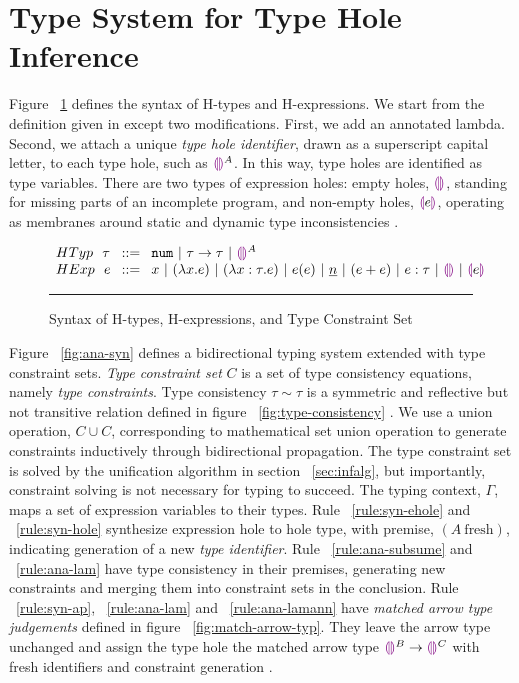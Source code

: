 \section{Type System for Type Hole Inference}
\label{sec:typinf}
Figure ~\ref{fig:syntax_fig} defines the syntax of H-types and H-expressions. We start from the definition given in \citet{HazelnutPOPL} except two modifications. First, we add an annotated lambda. Second, we attach a unique \emph{type hole identifier}, drawn as a superscript capital letter, to each type hole, such as $\textcolor{violet}{\llparenthesis}\textcolor{violet}{\rrparenthesis}^A$. In this way, type holes are identified as type variables. There are two types of expression holes: empty holes, $\textcolor{violet}{\llparenthesis}\textcolor{violet}{\rrparenthesis}$, standing for missing parts of an incomplete program, and non-empty holes, $\textcolor{violet}{\llparenthesis} e \textcolor{violet}{\rrparenthesis}$, operating as membranes around static and dynamic type inconsistencies \cite{HazelLive}. \par
\begin{figure}[htbp]
\vspace{-3px} 
$\arraycolsep=4pt\begin{array}{lll}
HTyp~~ \tau & ::= &
  \tnum ~\vert~
  \tarr{\tau}{\tau} ~\vert~
  \ehole^A
  \\
HExp~~ e & ::= &
  x ~\vert~
  \lamfunc{x}{e} ~\vert~
  \lamfunc{x:\tau}{e} ~\vert~
  e(e) ~\vert~
  \underlinenum{n} ~\vert~
  (e+e) ~\vert~
  e: \tau ~\vert~
  \ehole  ~\vert~
  \notehole{e} 
\end{array}$
\hrule
\caption{Syntax of H-types, H-expressions, and Type Constraint Set}
\label{fig:syntax_fig}
\vspace{-5px}
\end{figure}
Figure ~\ref{fig:ana-syn} defines a bidirectional typing system extended with type constraint sets. \emph{Type constraint set} $C$ is a set of type consistency equations, namely \emph{type constraints}. Type consistency $\tau \sim \tau$ is a symmetric and reflective but not transitive relation defined in figure ~\ref{fig:type-consistency} \cite{HazelnutPOPL}. We use a union operation, $C \cup C$, corresponding to mathematical set union operation to generate constraints inductively through bidirectional propagation. The type constraint set is solved by the unification algorithm in section ~\ref{sec:infalg}, but importantly, constraint solving is not necessary for typing to succeed. The typing context, $\Gamma$, maps a set of expression variables to their types. Rule ~\ref{rule:syn-ehole} and ~\ref{rule:syn-hole} synthesize expression hole to hole type, with premise, $(A ~ \text{fresh})$, indicating generation of a new \emph{type identifier}. Rule ~\ref{rule:ana-subsume} and ~\ref{rule:ana-lam} have type consistency in their premises, generating new constraints and merging them into constraint sets in the conclusion. Rule ~\ref{rule:syn-ap}, ~\ref{rule:ana-lam} and ~\ref{rule:ana-lamann} have \emph{matched arrow type judgements} defined in figure ~\ref{fig:match-arrow-typ}. They leave the arrow type unchanged and assign the type hole the matched arrow type $\textcolor{violet}{\llparenthesis}\textcolor{violet}{\rrparenthesis}^B \rightarrow \textcolor{violet}{\llparenthesis}\textcolor{violet}{\rrparenthesis}^C$ with fresh identifiers and constraint generation \cite{HazelnutPOPL}.
